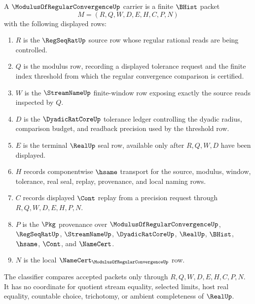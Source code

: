 \begin{definition}
\label{def:modulus-of-regular-convergence-carrier}
A $\ModulusOfRegularConvergenceUp$ carrier is a finite $\BHist$ packet
$$
M=(R,Q,W,D,E,H,C,P,N)
$$
with the following displayed rows:
\begin{enumerate}
\item $R$ is the $\RegSeqRatUp$ source row whose regular rational reads are being controlled.
\item $Q$ is the modulus row, recording a displayed tolerance request and the finite index threshold from which the regular convergence comparison is certified.
\item $W$ is the $\StreamNameUp$ finite-window row exposing exactly the source reads inspected by $Q$.
\item $D$ is the $\DyadicRatCoreUp$ tolerance ledger controlling the dyadic radius, comparison budget, and readback precision used by the threshold row.
\item $E$ is the terminal $\RealUp$ seal row, available only after $R,Q,W,D$ have been displayed.
\item $H$ records componentwise $\hsame$ transport for the source, modulus, window, tolerance, real seal, replay, provenance, and local naming rows.
\item $C$ records displayed $\Cont$ replay from a precision request through $R,Q,W,D,E,H,P,N$.
\item $P$ is the $\Pkg$ provenance over $\ModulusOfRegularConvergenceUp$, $\RegSeqRatUp$, $\StreamNameUp$, $\DyadicRatCoreUp$, $\RealUp$, $\BHist$, $\hsame$, $\Cont$, and $\NameCert$.
\item $N$ is the local $\NameCert_{\ModulusOfRegularConvergenceUp}$ row.
\end{enumerate}
The classifier compares accepted packets only through $R,Q,W,D,E,H,C,P,N$. It has no coordinate for quotient stream equality, selected limits, host real equality, countable choice, trichotomy, or ambient completeness of $\RealUp$.
\end{definition}

